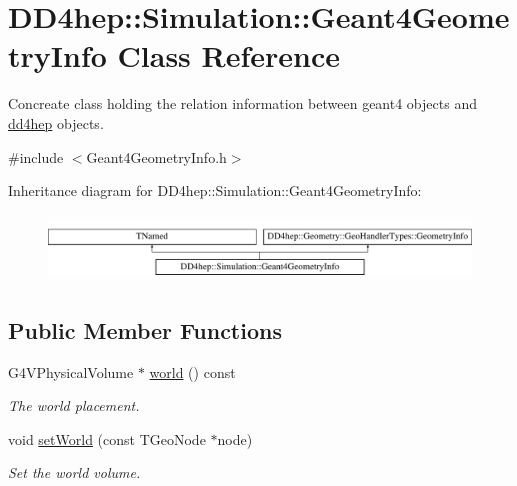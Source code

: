\hypertarget{class_d_d4hep_1_1_simulation_1_1_geant4_geometry_info}{}\section{D\+D4hep\+:\+:Simulation\+:\+:Geant4\+Geometry\+Info Class Reference}
\label{class_d_d4hep_1_1_simulation_1_1_geant4_geometry_info}


Concreate class holding the relation information between geant4 objects and \hyperlink{namespacedd4hep}{dd4hep} objects.  




{\ttfamily \#include $<$Geant4\+Geometry\+Info.\+h$>$}

Inheritance diagram for D\+D4hep\+:\+:Simulation\+:\+:Geant4\+Geometry\+Info\+:\begin{figure}[H]
\begin{center}
\leavevmode
\includegraphics[height=1.777778cm]{class_d_d4hep_1_1_simulation_1_1_geant4_geometry_info}
\end{center}
\end{figure}
\subsection*{Public Member Functions}
\begin{DoxyCompactItemize}
\item 
G4\+V\+Physical\+Volume $\ast$ \hyperlink{class_d_d4hep_1_1_simulation_1_1_geant4_geometry_info_a94a69c8ce55611620b823c38e35f65a5}{world} () const
\begin{DoxyCompactList}\small\item\em The world placement. \end{DoxyCompactList}\item 
void \hyperlink{class_d_d4hep_1_1_simulation_1_1_geant4_geometry_info_a9ccd539edd7ae098b69bcb3b035b8daf}{set\+World} (const T\+Geo\+Node $\ast$node)
\begin{DoxyCompactList}\small\item\em Set the world volume. \end{DoxyCompactList}\end{DoxyCompactItemize}
